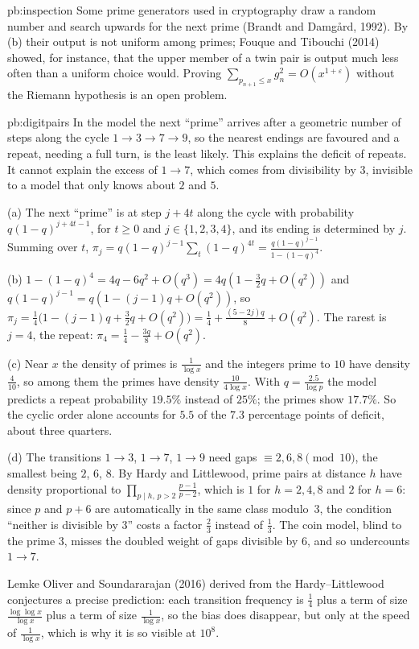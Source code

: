 \begin{solution}{pb:inspection}
\leads Some prime generators used in cryptography draw a random number and search upwards for the next prime (Brandt and Damg\aa rd, 1992). By (b) their output is not uniform among
primes; Fouque and Tibouchi (2014) showed, for instance, that the upper member of a twin pair is output much less often than a uniform choice would. Proving
$\sum_{p_{n+1}\le x}g_n^2=O(x^{1+\varepsilon})$ without the Riemann hypothesis is an open problem.
\end{solution}

\begin{solution}{pb:digitpairs}
\idea In the model the next ``prime'' arrives after a geometric number of steps along the cycle $1\to3\to7\to9$, so the nearest endings are favoured and a repeat, needing a full turn,
is the least likely. This explains the deficit of repeats. It cannot explain the excess of $1\to7$, which comes from divisibility by $3$, invisible to a model that only knows
about $2$ and $5$.

\writeup (a) The next ``prime'' is at step $j+4t$ along the cycle with probability $q(1-q)^{j+4t-1}$, for $t\ge0$ and $j\in\{1,2,3,4\}$, and its ending is determined by $j$.
Summing over $t$, $\pi_j=q(1-q)^{j-1}\sum_t(1-q)^{4t}=\frac{q(1-q)^{j-1}}{1-(1-q)^4}$.

(b) $1-(1-q)^4=4q-6q^2+O(q^3)=4q(1-\frac32q+O(q^2))$ and $q(1-q)^{j-1}=q(1-(j-1)q+O(q^2))$, so
$\pi_j=\frac14\bigl(1-(j-1)q+\frac32q+O(q^2)\bigr)=\frac14+\frac{(5-2j)q}8+O(q^2)$. The rarest is $j=4$, the repeat: $\pi_4=\frac14-\frac{3q}8+O(q^2)$.

(c) Near $x$ the density of primes is $\frac1{\log x}$ and the integers prime to $10$ have density $\frac4{10}$, so among them the primes have density $\frac{10}{4\log x}$. With $q=\frac{2.5}{\log p}$ the
model predicts a repeat probability $19.5\%$ instead of $25\%$; the primes show $17.7\%$. So the cyclic order alone accounts for $5.5$ of the $7.3$ percentage points of deficit, about three quarters.

(d) The transitions $1\to3$, $1\to7$, $1\to9$ need gaps $\equiv2,6,8\pmod{10}$, the smallest being $2$, $6$, $8$. By Hardy and Littlewood, prime pairs at distance $h$ have density
proportional to $\prod_{p\mid h,\,p>2}\frac{p-1}{p-2}$, which is $1$ for $h=2,4,8$ and $2$ for $h=6$: since $p$ and $p+6$ are automatically in the same class modulo~$3$, the condition
``neither is divisible by $3$'' costs a factor $\frac23$ instead of $\frac13$. The coin model, blind to the prime $3$, misses the doubled weight of gaps divisible by $6$, and so undercounts $1\to7$.

\leads Lemke Oliver and Soundararajan (2016) derived from the Hardy--Littlewood conjectures a precise prediction: each transition frequency is $\frac14$ plus a term of size
$\frac{\log\log x}{\log x}$ plus a term of size $\frac1{\log x}$, so the bias does disappear, but only at the speed of $\frac1{\log x}$, which is why it is so visible at $10^8$.
\end{solution}

